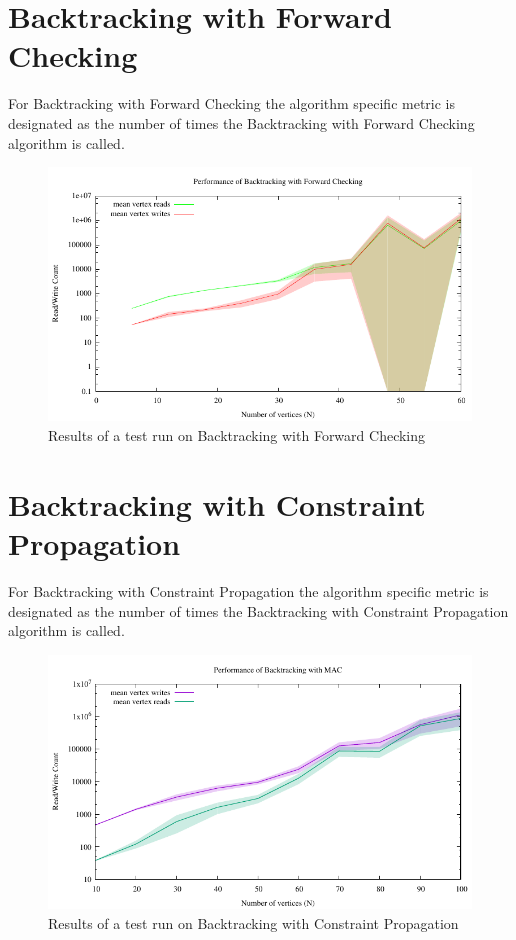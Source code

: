 \documentclass{article}
\begin{document}
\begin{multicols}{2}
\section{Backtracking with Forward Checking}
For Backtracking with Forward Checking the algorithm specific metric is designated as the number of times the Backtracking with Forward Checking algorithm is called.
\begin{figure}[H]
	\centering
	\includegraphics[width=\linewidth]{../results/backtracking_forward/bt_forward_performance}
	\caption{Results of a test run on Backtracking with Forward Checking}
\end{figure}

\section{Backtracking with Constraint Propagation}
For Backtracking with Constraint Propagation the algorithm specific metric is designated as the number of times the Backtracking with Constraint Propagation algorithm is called.
\begin{figure}[H]
	\centering
	\includegraphics[width=\linewidth]{../results/backtracking_mac/bt_mac_performance}
	\caption{Results of a test run on Backtracking with Constraint Propagation}


\end{figure}
\end{multicols}
\end{document}
